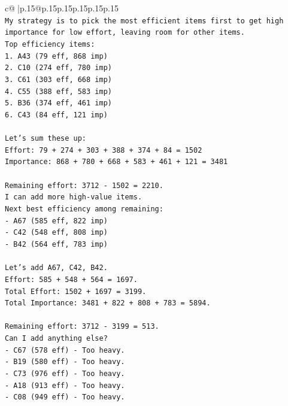 \documentclass{article}
\begin{document}
{\begin{supertabular}{c@{$\;$}|p{.15\linewidth}@{}p{.15\linewidth}p{.15\linewidth}p{.15\linewidth}p{.15\linewidth}p{.15\linewidth}}
{{{\\ 
\texttt{My strategy is to pick the most efficient items first to get high importance for low effort, leaving room for other items.} \\
\texttt{Top efficiency items:} \\
\texttt{1. A43 (79 eff, 868 imp)} \\
\texttt{2. C10 (274 eff, 780 imp)} \\
\texttt{3. C61 (303 eff, 668 imp)} \\
\texttt{4. C55 (388 eff, 583 imp)} \\
\texttt{5. B36 (374 eff, 461 imp)} \\
\texttt{6. C43 (84 eff, 121 imp)} \\
\\ 
\texttt{Let's sum these up:} \\
\texttt{Effort: 79 + 274 + 303 + 388 + 374 + 84 = 1502} \\
\texttt{Importance: 868 + 780 + 668 + 583 + 461 + 121 = 3481} \\
\\ 
\texttt{Remaining effort: 3712 {-} 1502 = 2210.} \\
\texttt{I can add more high{-}value items.} \\
\texttt{Next best efficiency among remaining:} \\
\texttt{{-} A67 (585 eff, 822 imp)} \\
\texttt{{-} C42 (548 eff, 808 imp)} \\
\texttt{{-} B42 (564 eff, 783 imp)} \\
\\ 
\texttt{Let's add A67, C42, B42.} \\
\texttt{Effort: 585 + 548 + 564 = 1697.} \\
\texttt{Total Effort: 1502 + 1697 = 3199.} \\
\texttt{Total Importance: 3481 + 822 + 808 + 783 = 5894.} \\
\\ 
\texttt{Remaining effort: 3712 {-} 3199 = 513.} \\
\texttt{Can I add anything else?} \\
\texttt{{-} C67 (578 eff) {-} Too heavy.} \\
\texttt{{-} B19 (580 eff) {-} Too heavy.} \\
\texttt{{-} C73 (976 eff) {-} Too heavy.} \\
\texttt{{-} A18 (913 eff) {-} Too heavy.} \\
\texttt{{-} C08 (949 eff) {-} Too heavy.} \\
}}}
\end{supertabular}}
\end{document}
